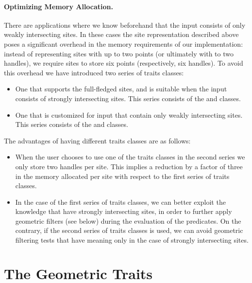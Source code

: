 \paragraph{Optimizing Memory Allocation.}
There are applications where we know beforehand that the input
consists of only weakly intersecting sites. In these cases the site
representation described above poses a significant overhead in the
memory requirements of our implementation: instead of representing
sites with up to two points (or ultimately with to two handles), we
require sites to store six points (respectively, six handles). To
avoid this overhead we have introduced two series of traits classes:
\begin{itemize}
\item One that supports the full-fledged sites, and is suitable when
  the input consists of strongly intersecting sites. This series
  consists of the 
   and
  classes.
\item One that is customized for input that contain only weakly
  intersecting sites. This series consists of the
   and
  classes.
\end{itemize}
The advantages of having different traits classes are as follows:
\begin{itemize}
\item When the user chooses to use one of the traits classes in the
  second series we only store two handles per site. This implies a
  reduction by a factor of three in the memory allocated per site with
  respect to the first series of traits classes.
\item In the case of the first series of traits classes, we can better
  exploit the knowledge that have strongly intersecting sites, in
  order to further apply geometric filters (see below) during the
  evaluation of the predicates. On the contrary, if the second series
  of traits classes is used, we can avoid geometric filtering tests
  that have meaning only in the case of strongly intersecting sites.
\end{itemize}


\section{The Geometric Traits}
\label{sec:sdg2-traits}

